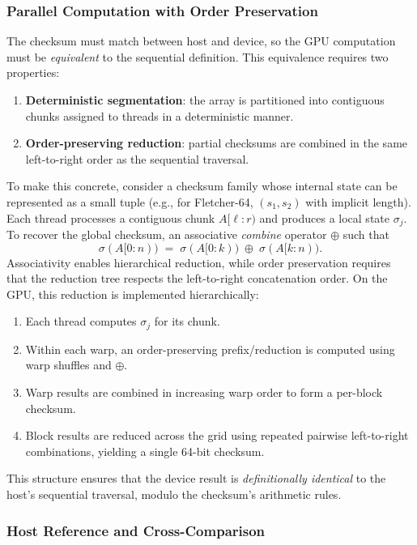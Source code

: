 \subsubsection{Parallel Computation with Order Preservation}

The checksum must match between host and device, so the GPU computation must be
\emph{equivalent} to the sequential definition. This equivalence requires two properties:
\begin{enumerate}
  \item \textbf{Deterministic segmentation}: the array is partitioned into
  contiguous chunks assigned to threads in a deterministic manner.
  \item \textbf{Order-preserving reduction}: partial checksums are combined in
  the same left-to-right order as the sequential traversal.
\end{enumerate}

To make this concrete, consider a checksum family whose internal state can be
represented as a small tuple (e.g., for Fletcher-64, $(s_1,s_2)$ with implicit
length). Each thread processes a contiguous chunk $A[\ell:r)$ and produces a
local state $\sigma_j$. To recover the global checksum, an
associative \emph{combine} operator $\oplus$ such that
\begin{equation}
  \sigma(A[0:n)) \;=\; \sigma(A[0:k)) \;\oplus\; \sigma(A[k:n)).
\end{equation}
Associativity enables hierarchical reduction, while order preservation requires
that the reduction tree respects the left-to-right concatenation order. On the
GPU, this reduction is implemented hierarchically:
\begin{enumerate}
  \item Each thread computes $\sigma_j$ for its chunk.
  \item Within each warp, an order-preserving prefix/reduction is computed using
  warp shuffles and $\oplus$.
  \item Warp results are combined in increasing warp order to form a per-block
  checksum.
  \item Block results are reduced across the grid using repeated pairwise
  left-to-right combinations, yielding a single 64-bit checksum.
\end{enumerate}
This structure ensures that the device result is \emph{definitionally identical}
to the host's sequential traversal, modulo the checksum's arithmetic rules.

\subsubsection{Host Reference and Cross-Comparison}

